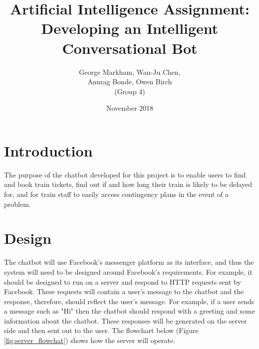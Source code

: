 \documentclass[12pt,a4paper]{article}
\title{Artificial Intelligence Assignment: Developing an Intelligent Conversational Bot}
\author{George Markham, Wan-Ju Chen, \\ Anurag Bonde, Owen Birch \\ (Group 4)} %
\date{November 2018}
\begin{document}
    \maketitle
    \section{Introduction}
    The purpose of the chatbot developed for this project is to enable users to find and book train tickets, find out if and how long their train is likely to be delayed for, and for train staff to easily access contingency plans in the event of a problem.
    
    \section{Design}
    The chatbot will use Facebook's messenger platform as its interface, and thus the system will need to be designed around Facebook's requirements. For example, it should be designed to run on a server and respond to HTTP requests sent by Facebook. These requests will contain a user's message to the chatbot and the response, therefore, should reflect the user's message. For example, if a user sends a message such as "Hi" then the chatbot should respond with a greeting and some information about the chatbot. These responses will be generated on the server side and then sent out to the user. The flowchart below (Figure \ref{fig:server_flowchat}) shows how the server will operate.
    
\end{document}

